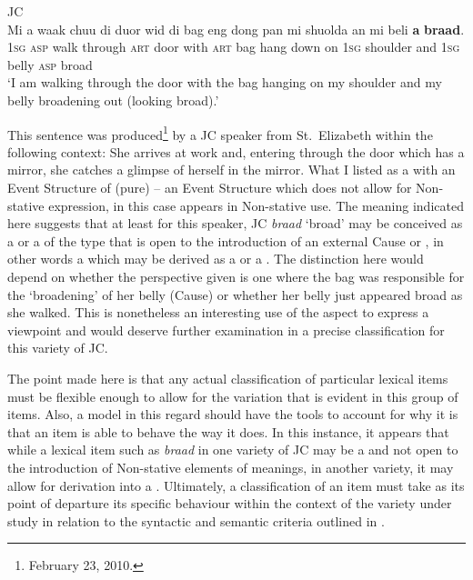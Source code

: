 \ea%
 \label{ex:5:19}
 JC\\
     \gll Mi        a       waak chuu           di   duor wid           di bag eng   dong pan        mi shuolda    an          mi beli   \textbf{a} \textbf{braad}.\\
 \textsc{1sg} \textsc{asp} walk through \textsc{art} door with \textsc{art} bag hang  down on \textsc{1sg} shoulder and \textsc{1sg} belly  \textsc{asp} broad\\
\glt `I am walking through the door with the bag hanging on my shoulder and my belly broadening out (looking broad).'
 \z

This sentence was produced\footnote{February 23, 2010.} by a JC speaker from St.\ Elizabeth within the following context: She arrives at work and, entering through the door which has a mirror, she catches a glimpse of herself in the mirror. What I listed as a  with an Event Structure of (pure)  – an Event Structure which does not allow for Non-stative expression, in this case appears in Non-stative use. The meaning indicated here suggests that at least for this speaker, JC \textit{braad} `broad' may be conceived as a  or a  of the type that is open to the introduction of an external Cause or , in other words a  which may be derived as a  or a . The distinction here would depend on whether the perspective given is one where the bag was responsible for the `broadening' of her belly (Cause) or whether her belly just appeared broad as she walked. This is nonetheless an interesting use of the  aspect to express a viewpoint and would deserve further examination in a precise classification for this variety of JC.


The point made here is that any actual classification of particular lexical items must be flexible enough to allow for the variation that is evident in this group of items. Also, a model in this regard should have the tools to account for why it is that an item is able to behave the way it does. In this instance, it appears that while a lexical item such as \textit{braad} in one variety of JC may be a  and not open to the introduction of Non-stative elements of meanings, in another variety, it may allow for derivation into a . Ultimately, a classification of an item must take as its point of departure its specific behaviour within the context of the variety under study in relation to the syntactic and semantic criteria outlined in . 

